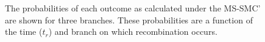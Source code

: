 \documentclass[11pt]{article}
\begin{document}
\begin{figure}
{		%
		The probabilities of each outcome as calculated under the MS-SMC' 
		are shown for three branches. These probabilities are a function of the time ($t_r$) and branch 
		on which recombination occurs.
	}
	\label{fig:fig1}
\end{figure}
\end{document}
